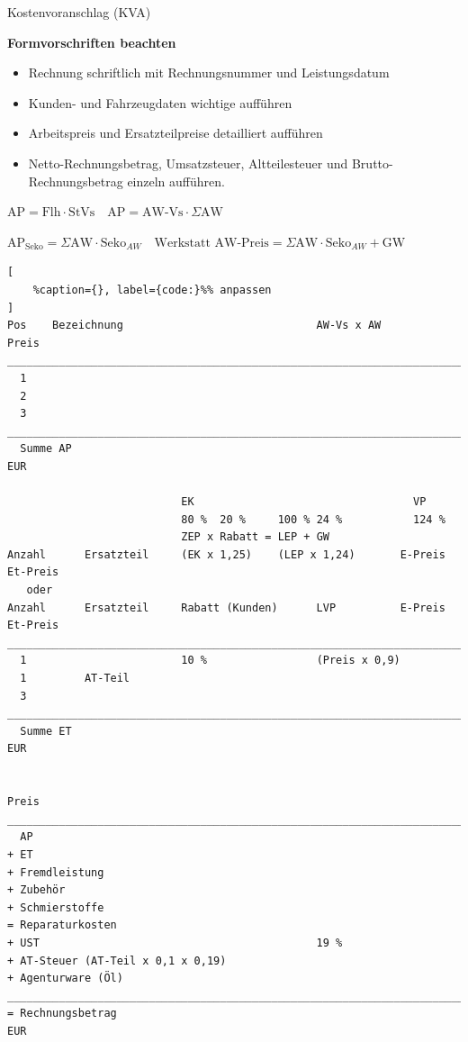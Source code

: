 Kostenvoranschlag (KVA)

\textbf{Formvorschriften beachten}

\begin{itemize}
\item
  Rechnung schriftlich mit Rechnungsnummer und Leistungsdatum
\item
  Kunden- und Fahrzeugdaten wichtige aufführen
\item
  Arbeitspreis und Ersatzteilpreise detailliert aufführen
\item
  Netto-Rechnungsbetrag, Umsatzsteuer, Altteilesteuer und
  Brutto-Rechnungsbetrag einzeln aufführen.
\end{itemize}

$\text{AP} = \text{Flh} \cdot \text{StVs} \quad \text{AP} = \text{AW-Vs} \cdot \Sigma \text{AW}$

$\text{AP}_\text{Seko} = \Sigma \text{AW} \cdot \text{Seko}_{AW} \quad \text{Werkstatt AW-Preis} = \Sigma \text{AW} \cdot \text{Seko}_{AW} + \text{GW}$

\lstset{language=Python}%
\begin{lstlisting}[
	%caption={}, label={code:}%% anpassen
]
Pos    Bezeichnung                              AW-Vs x AW           Preis
_____________________________________________________________________________
  1
  2
  3
_____________________________________________________________________________
  Summe AP                                                                EUR

                           EK                                  VP
                           80 %  20 %     100 % 24 %           124 %
                           ZEP x Rabatt = LEP + GW                      
Anzahl      Ersatzteil     (EK x 1,25)    (LEP x 1,24)       E-Preis Et-Preis
   oder
Anzahl      Ersatzteil     Rabatt (Kunden)      LVP          E-Preis Et-Preis
_____________________________________________________________________________
  1                        10 %                 (Preis x 0,9)
  1         AT-Teil
  3
_____________________________________________________________________________
  Summe ET                                                                EUR

                                                                     Preis
_____________________________________________________________________________
  AP
+ ET
+ Fremdleistung
+ Zubehör
+ Schmierstoffe
= Reparaturkosten 
+ UST                                           19 % 
+ AT-Steuer (AT-Teil x 0,1 x 0,19)
+ Agenturware (Öl)
_____________________________________________________________________________
= Rechnungsbetrag                                                         EUR
\end{lstlisting}

